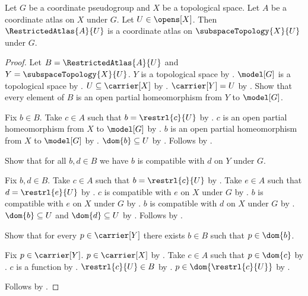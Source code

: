 \begin{classification}\label{restricted_atlas_is_atlas}
    Let $G$ be a coordinate pseudogroup and $X$ be a topological space.
    Let $A$ be a coordinate atlas on $X$ under $G$.
    Let $U\in\opens[X]$.
    Then $\RestrictedAtlas{A}{U}$ is a coordinate atlas on $\subspaceTopology{X}{U}$ under $G$.
\end{classification}
\begin{proof}
    Let $B=\RestrictedAtlas{A}{U}$ and $Y=\subspaceTopology{X}{U}$.
    $Y$ is a topological space by .
    $\model[G]$ is a topological space by .
    $U\subseteq\carrier[X]$ by .
    $\carrier[Y]=U$ by .
    Show that every element of $B$ is an open partial homeomorphism from $Y$ to $\model[G]$.
    \begin{subproof}
        Fix $b\in B$.
        Take $c\in A$ such that $b=\restrl{c}{U}$ by .
        $c$ is an open partial homeomorphism from $X$ to $\model[G]$ by .
        $b$ is an open partial homeomorphism from $X$ to $\model[G]$ by
            .
        $\dom{b}\subseteq U$ by .
        Follows by .
    \end{subproof}
    Show that for all $b,d\in B$ we have $b$ is compatible with $d$ on $Y$ under $G$.
    \begin{subproof}
        Fix $b,d\in B$.
        Take $c\in A$ such that $b=\restrl{c}{U}$ by .
        Take $e\in A$ such that $d=\restrl{e}{U}$ by .
        $c$ is compatible with $e$ on $X$ under $G$ by .
        $b$ is compatible with $e$ on $X$ under $G$ by .
        $b$ is compatible with $d$ on $X$ under $G$ by .
        $\dom{b}\subseteq U$ and $\dom{d}\subseteq U$ by
            .
        Follows by .
    \end{subproof}
    Show that for every $p\in\carrier[Y]$ there exists $b\in B$ such that $p\in\dom{b}$.
    \begin{subproof}
        Fix $p\in\carrier[Y]$.
        $p\in\carrier[X]$ by .
        Take $c\in A$ such that $p\in\dom{c}$ by .
        $c$ is a function by
            .
        $\restrl{c}{U}\in B$ by .
        $p\in\dom{\restrl{c}{U}}$ by .
    \end{subproof}
    Follows by .
\end{proof}

